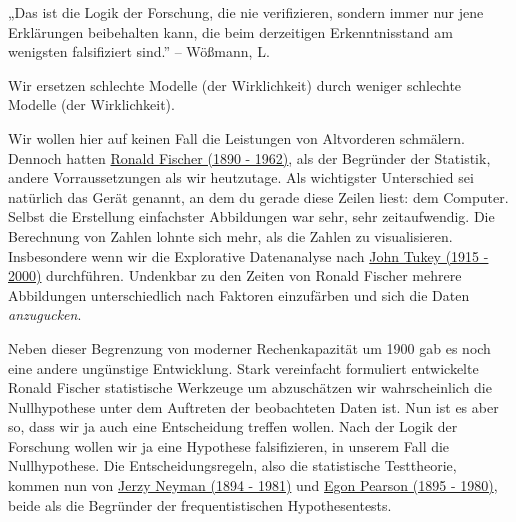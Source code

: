 \documentclass[
  letterpaper,
]{scrbook}
\begin{document}
\begin{tcolorbox}[enhanced jigsaw, coltitle=black, titlerule=0mm, bottomrule=.15mm, opacityback=0, opacitybacktitle=0.6, leftrule=.75mm, title=\textcolor{quarto-callout-note-color}{\faInfo}\hspace{0.5em}{Logik der Forschung}, toprule=.15mm, bottomtitle=1mm, toptitle=1mm, left=2mm, breakable, arc=.35mm, colback=white, rightrule=.15mm, colbacktitle=quarto-callout-note-color!10!white, colframe=quarto-callout-note-color-frame]
„Das ist die Logik der Forschung, die nie verifizieren, sondern immer
nur jene Erklärungen beibehalten kann, die beim derzeitigen
Erkenntnisstand am wenigsten falsifiziert sind.'' -- Wößmann, L.

Wir ersetzen schlechte Modelle (der Wirklichkeit) durch weniger
schlechte Modelle (der Wirklichkeit).
\end{tcolorbox}

Wir wollen hier auf keinen Fall die Leistungen von Altvorderen
schmälern. Dennoch hatten
\href{https://en.wikipedia.org/wiki/Ronald_Fisher}{Ronald Fischer (1890
- 1962)}, als der Begründer der Statistik, andere Vorraussetzungen als
wir heutzutage. Als wichtigster Unterschied sei natürlich das Gerät
genannt, an dem du gerade diese Zeilen liest: dem Computer. Selbst die
Erstellung einfachster Abbildungen war sehr, sehr zeitaufwendig. Die
Berechnung von Zahlen lohnte sich mehr, als die Zahlen zu visualisieren.
Insbesondere wenn wir die Explorative Datenanalyse nach
\href{https://en.wikipedia.org/wiki/John_Tukey}{John Tukey (1915 -
2000)} durchführen. Undenkbar zu den Zeiten von Ronald Fischer mehrere
Abbildungen unterschiedlich nach Faktoren einzufärben und sich die Daten
\emph{anzugucken}.

{}

Neben dieser Begrenzung von moderner Rechenkapazität um 1900 gab es noch
eine andere ungünstige Entwicklung. Stark vereinfacht formuliert
entwickelte Ronald Fischer statistische Werkzeuge um abzuschätzen wir
wahrscheinlich die Nullhypothese unter dem Auftreten der beobachteten
Daten ist. Nun ist es aber so, dass wir ja auch eine Entscheidung
treffen wollen. Nach der Logik der Forschung wollen wir ja eine
Hypothese falsifizieren, in unserem Fall die Nullhypothese. Die
Entscheidungsregeln, also die statistische Testtheorie, kommen nun von
\href{https://en.wikipedia.org/wiki/Jerzy_Neyman}{Jerzy Neyman (1894 -
1981)} und \href{https://en.wikipedia.org/wiki/Egon_Pearson}{Egon
Pearson (1895 - 1980)}, beide als die Begründer der frequentistischen
Hypothesentests.
\end{document}
